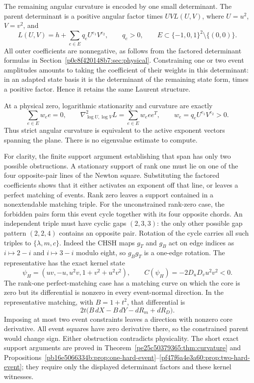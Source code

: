 The remaining angular curvature is encoded by one small determinant.
The parent determinant is a positive angular factor times $UVL(U,V)$,
where $U=u^2$, $V=v^2$, and
\begin{equation}\label{p2c3fc22497a5:eq:pp-laurent}
 L(U,V)=h+\sum_{e\in E}q_eU^{e_1}V^{e_2},
 \qquad q_e>0,\qquad
 E\subset\{-1,0,1\}^2\setminus\{(0,0)\}.
\end{equation}
All outer coefficients are nonnegative, as follows from the factored
determinant formulas in Section~\ref{p0c8f420148b7:sec:physical}.  Constraining one or two
event amplitudes amounts to taking the coefficient of their weights in
this determinant: in an adapted state basis it is the determinant of the
remaining state form, times a positive factor.  Hence it retains the same
Laurent structure.

At a physical zero, logarithmic stationarity and curvature are exactly
\begin{equation}\label{p2c3fc22497a5:eq:pp-newton-hessian}
 \sum_{e\in E}w_e e=0,\qquad
 \nabla^2_{\log U,\log V}L=\sum_{e\in E}w_e ee^T,
 \qquad w_e=q_eU^{e_1}V^{e_2}>0.
\end{equation}
Thus strict angular curvature is equivalent to the active exponent vectors
spanning the plane.  There is no eigenvalue estimate to compute.

For clarity, the finite support argument establishing that span has only
two possible obstructions.  A stationary support of rank one must lie on
one of the four opposite-pair lines of the Newton square.  Substituting the
factored coefficients shows that it either activates an exponent off that
line, or leaves a perfect matching of events.  Rank zero leaves a support
contained in a nonextendable matching triple.  For the unconstrained rank-zero case, the forbidden pairs form this
event cycle together with its four opposite chords.  An independent triple
must have cyclic gaps $(2,3,3)$: the only other possible gap pattern
$(2,2,4)$ contains an opposite pair.  Rotation of the cycle carries all such
triples to $\{\lambda,m,c\}$.  Indeed the CHSH maps $g_T$ and $g_B$ act on
edge indices as $i\mapsto2-i$ and $i\mapsto3-i$ modulo eight, so
$g_Bg_T$ is a one-edge rotation.  The representative has the exact kernel state
\[
 \psi_H=(uv,-u,u^2v,1+v^2+u^2v^2),\qquad
 C(\psi_H)=-2D_uD_vu^2v^2<0.
\]
The rank-one perfect-matching case has a
matching curve on which the core is zero but its differential is nonzero
in every event-normal direction.  In the representative matching, with
$B=1+t^2$, that differential is
\[
              2t\big(B\,dX-B\,dY-dR_m+dR_D\big).
\]
Imposing at most two event constraints leaves a direction with nonzero
core derivative.  All event squares have zero derivative there, so the
constrained parent would change sign.  Either obstruction contradicts
physicality.  The short exact support arguments are proved in
Theorem~\ref{pe25c50379365:thm:curvature} and
Propositions~\ref{pb16e5066334b:prop:one-hard-event}--\ref{pf47f6a4e3a60:prop:two-hard-event}; they require
only the displayed determinant factors and these kernel witnesses.

